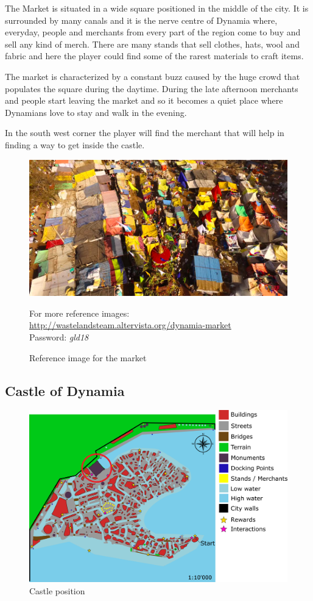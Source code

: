 The Market is situated in a wide square positioned in the middle of the city. It is surrounded by many canals and it is the nerve centre of Dynamia where, everyday, people and merchants from every part of the region come to buy and sell any kind of merch. There are many stands that sell clothes, hats, wool and fabric and here the player could find some of the rarest materials to craft items.

The market is characterized by a constant buzz caused by the huge crowd that populates  the square during the daytime. During the late afternoon merchants and people start leaving the market and so it becomes a quiet place where Dynamians love to stay and walk in the evening.

In the south west corner the player will find the merchant that will help in finding a way to get inside the castle.
 
\begin{figure}[H]
  \centering
  \includegraphics[width=\textwidth]{Images/Landmarks/market}

  \caption{Reference image for the market}
    For more reference images: \href{http://wastelandsteam.altervista.org/dynamia-dead-end}{http://wastelandsteam.altervista.org/dynamia-market}\\Password: \textit{gld18}
\end{figure}

\subsection{Castle of Dynamia}
\begin{figure}[H]
  \centering
  \includegraphics[width=12cm]{Images/Maps/dynamia_castleOfDynamia}
  \caption{Castle position}
\end{figure}

